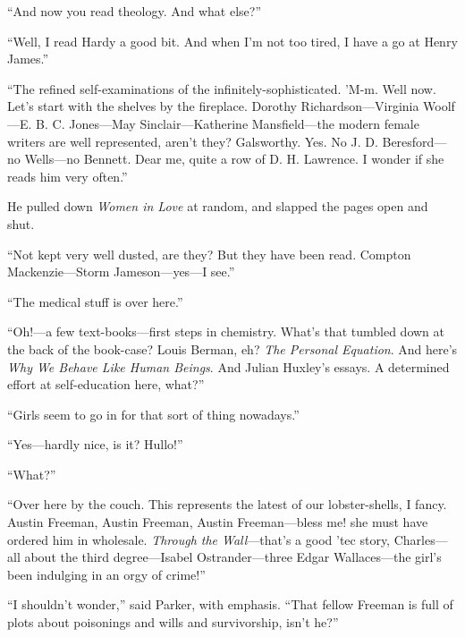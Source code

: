 \enquote{And now you read theology. And what else?}

\enquote{Well, I read Hardy a good bit. And when I'm not too tired, I have a go at Henry James.}

\enquote{The refined self-examinations of the infinitely-sophisticated. 'M-m. Well now. Let's start with the shelves by the fireplace. Dorothy Richardson\allowbreak---\allowbreak Virginia Woolf\allowbreak---\allowbreak E. B. C. Jones\allowbreak---\allowbreak May Sinclair\allowbreak---\allowbreak Katherine Mansfield\allowbreak---\allowbreak the modern female writers are well represented, aren't they? Galsworthy. Yes. No J. D. Beresford\allowbreak---\allowbreak no Wells\allowbreak---\allowbreak no Bennett. Dear me, quite a row of D. H. Lawrence. I wonder if she reads him very often.}

He pulled down \textit{Women in Love} at random, and slapped the pages open and shut.

\enquote{Not kept very well dusted, are they? But they have been read. Compton Mackenzie\allowbreak---\allowbreak Storm Jameson\allowbreak---\allowbreak yes---I see.}

\enquote{The medical stuff is over here.}

\enquote{Oh!---a few text-books\allowbreak---\allowbreak first steps in chemistry. What's that tumbled down at the back of the book-case? Louis Berman, eh? \textit{The Personal Equation}. And here's \textit{Why We Behave Like Human Beings}. And Julian Huxley's essays. A determined effort at self-education here, what?}

\enquote{Girls seem to go in for that sort of thing nowadays.}

\enquote{Yes\allowbreak---\allowbreak hardly nice, is it? Hullo!}

\enquote{What?}

\enquote{Over here by the couch. This represents the latest of our lobster-shells, I fancy. Austin Freeman, Austin Freeman, Austin Freeman\allowbreak---\allowbreak bless me! she must have ordered him in wholesale. \textit{Through the Wall}---that's a good 'tec story, Charles\allowbreak---\allowbreak all about the third degree\allowbreak---\allowbreak Isabel Ostrander\allowbreak---\allowbreak three Edgar Wallaces\allowbreak---\allowbreak the girl's been indulging in an orgy of crime!}

\enquote{I shouldn't wonder,} said Parker, with emphasis. \enquote{That fellow Freeman is full of plots about poisonings and wills and survivorship, isn't he?}

